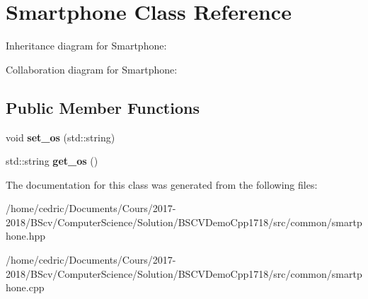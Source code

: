 \hypertarget{class_smartphone}{}\section{Smartphone Class Reference}
\label{class_smartphone}


Inheritance diagram for Smartphone\+:


Collaboration diagram for Smartphone\+:
\subsection*{Public Member Functions}
\begin{DoxyCompactItemize}
\item 
\mbox{\label{class_smartphone_a951194be8c453a16f94e2732140b1119}} 
void {\bfseries set\+\_\+os} (std\+::string)
\item 
\mbox{\label{class_smartphone_abbfc822091d9178faa7e36e7629d95ab}} 
std\+::string {\bfseries get\+\_\+os} ()
\end{DoxyCompactItemize}


The documentation for this class was generated from the following files\+:\begin{DoxyCompactItemize}
\item 
/home/cedric/\+Documents/\+Cours/2017-\/2018/\+B\+Scv/\+Computer\+Science/\+Solution/\+B\+S\+C\+V\+Demo\+Cpp1718/src/common/smartphone.\+hpp\item 
/home/cedric/\+Documents/\+Cours/2017-\/2018/\+B\+Scv/\+Computer\+Science/\+Solution/\+B\+S\+C\+V\+Demo\+Cpp1718/src/common/smartphone.\+cpp\end{DoxyCompactItemize}
